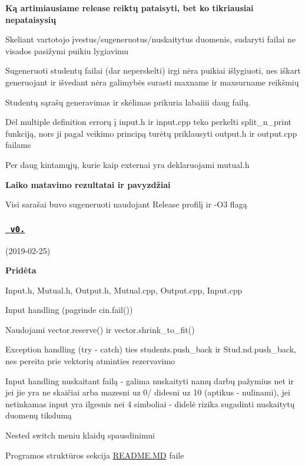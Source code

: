 {\bfseries{Ką artimiausiame release reiktų pataisyti, bet ko tikriausiai nepataisysių}}
\begin{DoxyItemize}
\item Skeliant vartotojo įvestus/sugeneruotus/nuskaitytus duomenis, sudaryti failai ne visados pasižymi puikiu lygiavimu
\item Sugeneruoti studentų failai (dar neperskelti) irgi nėra puikiai išlygiuoti, nes iškart generuojant ir išvedant nėra galimybės surasti maxname ir maxsurname reikšmių
\item Studentų sąrašų generavimas ir skėlimas prikuria labaiiii daug failų.
\item Dėl multiple definition errorų į {\ttfamily input.\+h} ir {\ttfamily input.\+cpp} teko perkelti split\+\_\+n\+\_\+print funkciją, nors ji pagal veikimo principą turėtų priklausyti {\ttfamily output.\+h} ir {\ttfamily output.\+cpp} failams
\item Per daug kintamųjų, kurie kaip extern\textquotesingle{}ai yra deklaruojami {\ttfamily mutual.\+h}
\end{DoxyItemize}

{\bfseries{Laiko matavimo rezultatai ir pavyzdžiai}}
\begin{DoxyItemize}
\item Visi sarašai buvo sugeneruoti naudojant Release profilį ir -\/O3 flagą
\end{DoxyItemize}



 \subsubsection*{\href{https://github.com/gitguuddd/Obj_Duomenu_apdorojimas/releases/tag/v0.3}{\texttt{ v0.}}}

(2019-\/02-\/25)

{\bfseries{Pridėta}}
\begin{DoxyItemize}
\item {\ttfamily Input.\+h, Mutual.\+h, Output.\+h, Mutual.\+cpp, Output.\+cpp, Input.\+cpp}
\item Input handling (pagrinde {\ttfamily cin.\+fail()})
\item Naudojami {\ttfamily vector.\+reserve()} ir {\ttfamily vector.\+shrink\+\_\+to\+\_\+fit()}
\item Exception handling ({\ttfamily try -\/ catch}) ties {\ttfamily students.\+push\+\_\+back} ir {\ttfamily Stud.\+nd.\+push\+\_\+back}, nes pereita prie vektorių atminties rezervavimo
\item Input handling nuskaitant failą -\/ galima nuskaityti namų darbų pažymius net ir jei jie yra ne skaičiai arba mazesni uz 0/ didesni uz 10 (aptikus -\/ nulinami), jei netinkamas input yra ilgesnis nei 4 simboliai -\/ didelė rizika sugadinti nuskaitytų duomenų tikslumą
\item Nested switch meniu klaidų spausdinimui
\item Programos struktūros sekcija \mbox{\hyperlink{_r_e_a_d_m_e_8md}{R\+E\+A\+D\+M\+E.\+MD}} faile
\item 
\end{DoxyItemize}

